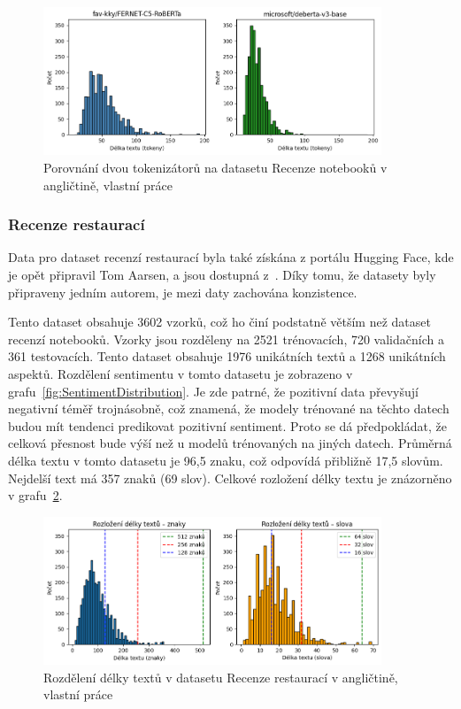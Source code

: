 \begin{figure}[ht]
    \centering
    \includegraphics[width=0.9\textwidth]{images/LaptopToken}
    \caption[Porovnání dvou tokenizátorů na datasetu Recenze notebooků v angličtině]%
    {Porovnání dvou tokenizátorů na datasetu Recenze notebooků v angličtině, vlastní práce}
    \label{fig:LaptopToken}
\end{figure}

\subsubsection{Recenze restaurací}
Data pro dataset recenzí restaurací byla také získána z portálu Hugging Face, kde je opět připravil Tom Aarsen, a jsou dostupná z~\cite{TomRestaurants}. Díky tomu, že datasety byly připraveny jedním autorem, je mezi daty zachována konzistence.

Tento dataset obsahuje 3602 vzorků, což ho činí podstatně větším než dataset recenzí notebooků. Vzorky jsou rozděleny na 2521 trénovacích, 720 validačních a 361 testovacích. Tento dataset obsahuje 1976 unikátních textů a 1268 unikátních aspektů. Rozdělení sentimentu v tomto datasetu je zobrazeno v grafu~\ref{fig:SentimentDistribution}. Je zde patrné, že pozitivní data převyšují negativní téměř trojnásobně, což znamená, že modely trénované na těchto datech budou mít tendenci predikovat pozitivní sentiment. Proto se dá předpokládat, že celková přesnost bude výší než u modelů trénovaných na jiných datech. Průměrná délka textu v tomto datasetu je 96,5 znaku, což odpovídá přibližně 17,5 slovům. Nejdelší text má 357 znaků (69 slov). Celkové rozložení délky textu je znázorněno v grafu~\ref{fig:RestaurantLenDistribution}.

\begin{figure}[ht]
    \centering
    \includegraphics[width=0.9\textwidth]{images/restaurants-distribution}
    \caption[Rozdělení délky textů v datasetu Recenze restaurací v angličtině]%
    {Rozdělení délky textů v datasetu Recenze restaurací v angličtině, vlastní práce}
    \label{fig:RestaurantLenDistribution}
\end{figure}


